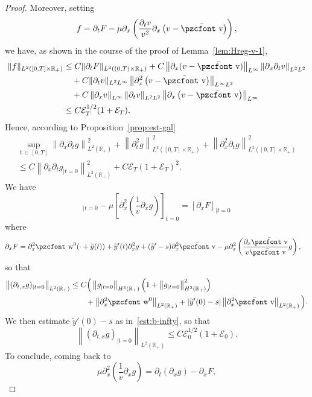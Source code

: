 \documentclass[10pt]{amsart}
\theoremstyle{definition}\newtheorem{defi}[theo]{Definition}\newtheorem{rema}[theo]{Remark}\newtheorem{exam}[theo]{Example}\newtheorem{exem}[theo]{Example}\newtheorem{nota}[theo]{Notation}
\newcommand{\mathpzc}[1]{\text{\pzcfont #1}}
\newcommand{\R}{\mathbb{R}}
\newcommand{\p}{\partial}
\newcommand{\bv}{\bar{\mathpzc{v}}}
\newcommand{\cE}{\mathcal E}
\newcommand{\tw}{\mathpzc{w}}
\newcommand{\ty}{\widetilde{y}}
\begin{document}
\begin{proof}
Moreover, setting
\[
f = \partial_t F- \mu \p_x \left(\frac{\p_t v}{v^2}\p_x \left(v-\bv\right)\right),
\]
we have, as shown in the course of the proof of Lemma~\ref{lem:Hreg-v-1},
\begin{align*}
\|f\|_{L^2([0,T] \times \R_+)} &\leq C \|\p_t F \|_{L^2((0,T)\times \R_+)}+ C \left\|\p_x (v-\bv)\right\|_{L^\infty} \left\|\p_x \p_t v\right\|_{L^2 L^2} \\
&\quad +C \|\p_t v\|_{L^2 L^\infty}\left\|\p_x^2\left(v-\bv\right)\right\|_{L^\infty L^2} \\
&\quad + C \left\|\p_x v\right\|_{L^\infty} \left\|\p_t v \right\|_{L^2 L^2}\left\|\p_x \left(v-\bv\right)\right\|_{L^\infty }\\
& \leq C \cE_T^{1/2} (1+ \cE_T).
\end{align*}
Hence, according to Proposition~\ref{prop:est-gal}
\begin{multline*}
\sup_{t\,\in\,[0,T]} \left\|\partial_x \partial_t g\right\|_{L^2(\R_+)}^2 + \left\|\partial^2_tg\right\|_{L^2([0,T] \times \R_+)}^2 + \left\|\partial^2_x \partial_t g\right\|_{L^2([0,T] \times \R_+)}^2 \\
 \leq C
\left\|\partial_x \partial_t g_{|t=0}\right\|_{L^2(\R_+)}^2 + C \cE_T (1+ \cE_T)^2.
\end{multline*}
We have
\begin{equation*}
[\partial_t \partial_xg]_{|t=0} - \mu \left[\partial^2_x\left(\dfrac{1}{v}\partial_xg\right)\right]_{t=0} = [\partial_x F]_{|t=0}
\end{equation*}
where
\begin{align*}
\partial_x F & = \partial^2_x \tw^0(\cdot + \ty(t)) + \ty'(t) \partial^2_x g + (\ty'-s)\partial^2_x \bv - \mu \partial^2_x\left(\dfrac{\partial_x \bv}{v \bv}g \right),
\end{align*}
so that
\begin{align*}
\left\|(\partial_{t,x}g)_{|t=0}\right\|_{L^2(\R_+)} &\leq C \Big(\left\|g_{|t=0}\right\|_{H^3(\R_+)} \left(1 + \left\| g_{|t=0}\right\|_{H^2(\R_+)}^2\right)\\
&\qquad + \left\|\partial^2_x \tw^0\right\|_{L^2(\R_+)} + |\ty'(0)-s| \left\|\partial^2_x \bv\right\|_{L^2(\R_+)}
\Big).
\end{align*}
We then estimate $\ty'(0)-s$ as in~\eqref{est:b-infty}, so that 
\[
\left\|(\partial_{t,x}g)_{|t=0}\right\|_{L^2(\R_+)}\leq C \cE_0^{1/2} (1+ \cE_0).
\]
To conclude, coming back to
\begin{equation*}
\mu \partial^2_x\left(\dfrac{1}{v} \partial_{x}g \right) = \partial_t (\partial_{x}g) - \partial_{x} F,

\end{equation*}
\end{proof}
\end{document}

